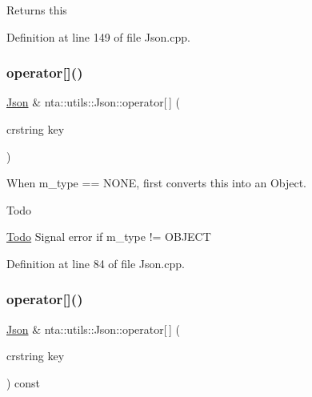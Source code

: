 Returns this 

Definition at line 149 of file Json.\+cpp.

\mbox{\label{classnta_1_1utils_1_1Json_adf2d340a2bf7d59c537e398a1be66cf7}} 
\subsubsection{\texorpdfstring{operator[]()}{operator[]()}\hspace{0.1cm}{\footnotesize\ttfamily [1/4]}}
{\footnotesize\ttfamily \hyperlink{classnta_1_1utils_1_1Json}{Json} \& nta\+::utils\+::\+Json\+::operator\mbox{[}$\,$\mbox{]} (\begin{DoxyParamCaption}\item[{crstring}]{key }\end{DoxyParamCaption})}



When m\+\_\+type == N\+O\+NE, first converts this into an Object. 

\begin{DoxyRefDesc}{Todo}
\item[\hyperlink{todo__todo000019}{Todo}]Signal error if m\+\_\+type != O\+B\+J\+E\+CT \end{DoxyRefDesc}


Definition at line 84 of file Json.\+cpp.

\mbox{\label{classnta_1_1utils_1_1Json_ab3b51a07ebed90330c98fd8e20785781}} 
\subsubsection{\texorpdfstring{operator[]()}{operator[]()}\hspace{0.1cm}{\footnotesize\ttfamily [2/4]}}
{\footnotesize\ttfamily \hyperlink{classnta_1_1utils_1_1Json}{Json} \& nta\+::utils\+::\+Json\+::operator\mbox{[}$\,$\mbox{]} (\begin{DoxyParamCaption}\item[{crstring}]{key }\end{DoxyParamCaption}) const}

